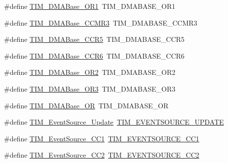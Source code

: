 \begin{DoxyCompactItemize}
\item 
\#define \hyperlink{group___h_a_l___t_i_m___aliased___defines_ga6868a38c42996b41d072025ce428c645}{T\+I\+M\+\_\+\+D\+M\+A\+Base\+\_\+\+O\+R1}~T\+I\+M\+\_\+\+D\+M\+A\+B\+A\+S\+E\+\_\+\+O\+R1
\item 
\#define \hyperlink{group___h_a_l___t_i_m___aliased___defines_gaeea36845ff52e436a46a294d0d01a193}{T\+I\+M\+\_\+\+D\+M\+A\+Base\+\_\+\+C\+C\+M\+R3}~T\+I\+M\+\_\+\+D\+M\+A\+B\+A\+S\+E\+\_\+\+C\+C\+M\+R3
\item 
\#define \hyperlink{group___h_a_l___t_i_m___aliased___defines_ga8e5e6af97873ab26e62274624f31adae}{T\+I\+M\+\_\+\+D\+M\+A\+Base\+\_\+\+C\+C\+R5}~T\+I\+M\+\_\+\+D\+M\+A\+B\+A\+S\+E\+\_\+\+C\+C\+R5
\item 
\#define \hyperlink{group___h_a_l___t_i_m___aliased___defines_ga9ab65ba1f7609de8bd7bf20319e60232}{T\+I\+M\+\_\+\+D\+M\+A\+Base\+\_\+\+C\+C\+R6}~T\+I\+M\+\_\+\+D\+M\+A\+B\+A\+S\+E\+\_\+\+C\+C\+R6
\item 
\#define \hyperlink{group___h_a_l___t_i_m___aliased___defines_ga2a1e120dc725fd26c37c29cf97fdcaa9}{T\+I\+M\+\_\+\+D\+M\+A\+Base\+\_\+\+O\+R2}~T\+I\+M\+\_\+\+D\+M\+A\+B\+A\+S\+E\+\_\+\+O\+R2
\item 
\#define \hyperlink{group___h_a_l___t_i_m___aliased___defines_gae675fedf9cf67bd86a36f17d37f99106}{T\+I\+M\+\_\+\+D\+M\+A\+Base\+\_\+\+O\+R3}~T\+I\+M\+\_\+\+D\+M\+A\+B\+A\+S\+E\+\_\+\+O\+R3
\item 
\#define \hyperlink{group___h_a_l___t_i_m___aliased___defines_gad6a75d19df73bae091a0e649fba7339c}{T\+I\+M\+\_\+\+D\+M\+A\+Base\+\_\+\+OR}~T\+I\+M\+\_\+\+D\+M\+A\+B\+A\+S\+E\+\_\+\+OR
\item 
\#define \hyperlink{group___h_a_l___t_i_m___aliased___defines_ga5bff72fbe94b1ae5a710e402c9868b23}{T\+I\+M\+\_\+\+Event\+Source\+\_\+\+Update}~\hyperlink{group___t_i_m___event___source_ga6b9d1352735d2ddbafcaa31ae05cd1ee}{T\+I\+M\+\_\+\+E\+V\+E\+N\+T\+S\+O\+U\+R\+C\+E\+\_\+\+U\+P\+D\+A\+TE}
\item 
\#define \hyperlink{group___h_a_l___t_i_m___aliased___defines_gaa634c46d4ac521ad16e25be97b487e8a}{T\+I\+M\+\_\+\+Event\+Source\+\_\+\+C\+C1}~\hyperlink{group___t_i_m___event___source_ga529eadf26cd17108dd95b9707a3d0f55}{T\+I\+M\+\_\+\+E\+V\+E\+N\+T\+S\+O\+U\+R\+C\+E\+\_\+\+C\+C1}
\item 
\#define \hyperlink{group___h_a_l___t_i_m___aliased___defines_ga5e2082a09552acc9c7e9577f104ba15a}{T\+I\+M\+\_\+\+Event\+Source\+\_\+\+C\+C2}~\hyperlink{group___t_i_m___event___source_ga12e3a98c601f4f288354ac2538050e6b}{T\+I\+M\+\_\+\+E\+V\+E\+N\+T\+S\+O\+U\+R\+C\+E\+\_\+\+C\+C2}

\end{DoxyCompactItemize}

